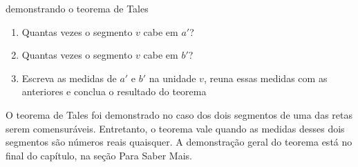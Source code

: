 \begin{task}{demonstrando o teorema de Tales}
\begin{enumerate}
\item {} 
Quantas vezes o segmento \(v\) cabe em \(a'\)?

\item {} 
Quantas vezes o segmento \(v\) cabe em \(b'\)?

\item {} 
Escreva as medidas de \(a'\) e \(b'\) na unidade \(v\), reuna essas medidas com as anteriores e conclua o resultado do teorema

\end{enumerate}
\end{task}



\begin{observation}{}

O teorema de Tales foi demonstrado no caso dos dois segmentos de uma das retas serem comensuráveis. Entretanto, o teorema vale quando as medidas desses dois segmentos são números reais quaisquer. A demonstração geral do teorema está no final do capítulo, na seção Para Saber Mais.
\end{observation}

